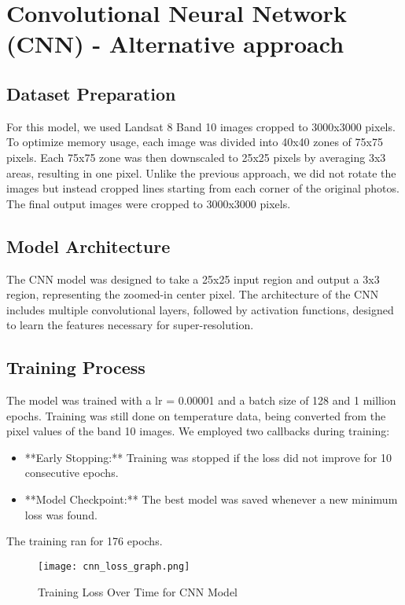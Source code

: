 \documentclass[runningheads,a4paper,11pt]{report}
\begin{document}
\section{Convolutional Neural Network (CNN) - Alternative approach}

\subsection{Dataset Preparation}

For this model, we used Landsat 8 Band 10 images cropped to 3000x3000 pixels. To optimize memory usage, each image was divided into 40x40 zones of 75x75 pixels. Each 75x75 zone was then downscaled to 25x25 pixels by averaging 3x3 areas, resulting in one pixel. Unlike the previous approach, we did not rotate the images but instead cropped lines starting from each corner of the original photos. The final output images were cropped to 3000x3000 pixels.

\subsection{Model Architecture}

The CNN model was designed to take a 25x25 input region and output a 3x3 region, representing the zoomed-in center pixel. The architecture of the CNN includes multiple convolutional layers, followed by activation functions, designed to learn the features necessary for super-resolution. \subsection{Training Process}
The model was trained with a lr = 0.00001 and a batch size of 128 and 1 million epochs. Training was still done on temperature data, being converted from the pixel values of the band 10 images.
We employed two callbacks during training:
\begin{itemize} 
    \item **Early Stopping:** Training was stopped if the loss did not improve for 10 consecutive epochs.
    \item **Model Checkpoint:** The best model was saved whenever a new minimum loss was found.
\end{itemize}
The training ran for 176 epochs.

\begin{figure}[H]
    \centering
    \texttt{[image: cnn\_loss\_graph.png]}
    \caption{Training Loss Over Time for CNN Model}
    \label{fig:cnnLossGraph}
\end{figure}
\end{document}
